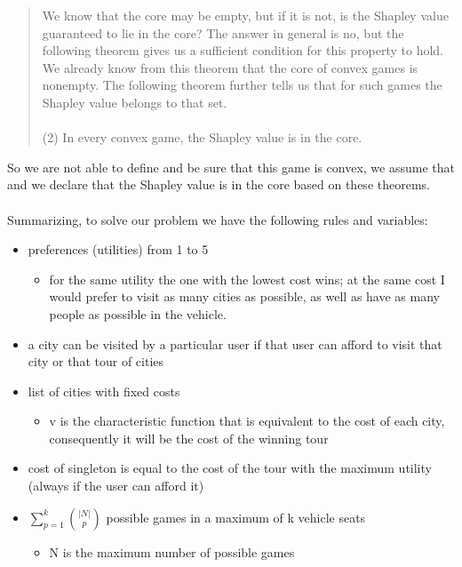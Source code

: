 \documentclass{article}
\begin{document}
{\begin{quote}
    We know that the core may be empty, but if it is not, is the Shapley value guaranteed to lie in the core? The answer in general is no, but the following theorem gives us a sufficient condition for this property to hold. We already know from this theorem that the core of convex games is nonempty. The following theorem further tells us that for such games the Shapley value belongs to that set.\\\\
    (2) In every convex game, the Shapley value is in the core.
\end{quote}
So we are not able to define and be sure that this game is convex, we assume that and we declare that the Shapley value is in the core based on these theorems.\\\\
Summarizing, to solve our problem we have the following rules and variables:
\begin{itemize}
    \item preferences (utilities) from 1 to 5
    \begin{itemize}
        \item for the same utility the one with the lowest cost wins; at the same cost I would prefer to visit as many cities as possible, as well as have as many people as possible in the vehicle.
    \end{itemize}
    \item a city can be visited by a particular user if that user can afford to visit that city or that tour of cities
    \item list of cities with fixed costs
     \begin{itemize}
        \item v is the characteristic function that is equivalent to the cost of each city, consequently it will be the cost of the winning tour
    \end{itemize}
    \item cost of singleton is equal to the cost of the tour with the maximum utility (always if the user can afford it)
    \item  $\displaystyle\sum_{p=1}^k \binom {{\vert N \vert}} {p}$ possible games in a maximum of k vehicle seats
     \begin{itemize}
        \item N is the maximum number of possible games
    \end{itemize}
\end{itemize}
}
\end{document}
